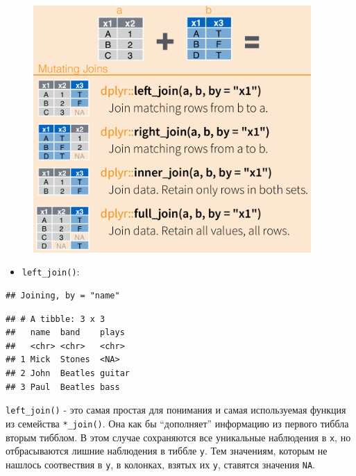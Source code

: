 \documentclass[]{book}
\newenvironment{Shaded}{\begin{snugshade}}{\end{snugshade}}
\newcommand{\KeywordTok}[1]{\textcolor[rgb]{0.13,0.29,0.53}{\textbf{#1}}}
\newcommand{\StringTok}[1]{\textcolor[rgb]{0.31,0.60,0.02}{#1}}
\newcommand{\OperatorTok}[1]{\textcolor[rgb]{0.81,0.36,0.00}{\textbf{#1}}}
\newcommand{\NormalTok}[1]{#1}
\providecommand{\tightlist}{%
  \setlength{\itemsep}{0pt}\setlength{\parskip}{0pt}}
\begin{document}
\begin{figure}
\centering
\includegraphics[width=4.16667in]{images/joins.png}
\caption{}
\end{figure}

\begin{itemize}
\tightlist
\item
  \texttt{left\_join()}:
\end{itemize}

\begin{Shaded}
\end{Shaded}

\begin{verbatim}
## Joining, by = "name"
\end{verbatim}

\begin{verbatim}
## # A tibble: 3 x 3
##   name  band    plays 
##   <chr> <chr>   <chr> 
## 1 Mick  Stones  <NA>  
## 2 John  Beatles guitar
## 3 Paul  Beatles bass
\end{verbatim}

\texttt{left\_join()} - это самая простая для понимания и самая
используемая функция из семейства \texttt{*\_join()}. Она как бы
``дополняет'' информацию из первого тиббла вторым тибблом. В этом случае
сохраняются все уникальные наблюдения в \texttt{x}, но отбрасываются
лишние наблюдения в тиббле \texttt{y}. Тем значениям, которым не нашлось
соотвествия в \texttt{y}, в колонках, взятых их \texttt{y}, ставятся
значения \texttt{NA}.
\end{document}
